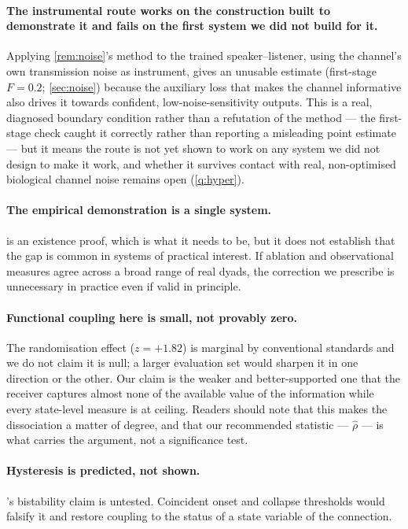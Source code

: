 \documentclass[11pt,a4paper]{article}
\theoremstyle{plain}
\theoremstyle{definition}
\theoremstyle{remark}
\begin{document}
\paragraph{The instrumental route works on the construction built to demonstrate it and fails on the first
system we did not build for it.}
Applying \cref{rem:noise}'s method to the trained speaker--listener, using the channel's own transmission noise
as instrument, gives an unusable estimate (first-stage $F = 0.2$; \cref{sec:noise}) because the auxiliary loss
that makes the channel informative also drives it towards confident, low-noise-sensitivity outputs. This is a
real, diagnosed boundary condition rather than a refutation of the method --- the first-stage check caught it
correctly rather than reporting a misleading point estimate --- but it means the route is not yet shown to work
on any system we did not design to make it work, and whether it survives contact with real, non-optimised
biological channel noise remains open (\cref{q:hyper}).

\paragraph{The empirical demonstration is a single system.}
 is an existence proof, which is what it needs to be, but it does not establish that the gap is
common in systems of practical interest. If ablation and observational measures agree across a broad range of
real dyads, the correction we prescribe is unnecessary in practice even if valid in principle.

\paragraph{Functional coupling here is small, not provably zero.}
The randomisation effect ($z = +1.82$) is marginal by conventional standards and we do not claim it is null; a
larger evaluation set would sharpen it in one direction or the other. Our claim is the weaker and
better-supported one that the receiver captures almost none of the available value of the information while
every state-level measure is at ceiling. Readers should note that this makes the dissociation a matter of
degree, and that our recommended statistic --- $\hat{\rho}$ --- is what carries the argument, not a significance
test.

\paragraph{Hysteresis is predicted, not shown.}
's bistability claim is untested. Coincident onset and collapse thresholds would falsify it and
restore coupling to the status of a state variable of the connection.
\end{document}
